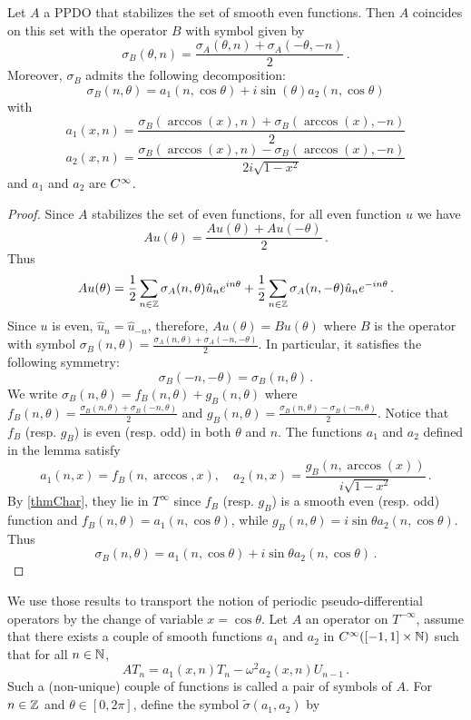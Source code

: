 \documentclass[a4paper]{article}
\begin{document}
\begin{Lem}
	\label{TransportPPDO_T}
	Let $A$ a PPDO that stabilizes the set of smooth even functions. Then $A$ coincides on this set with the operator $B$ with symbol given by 
	\[\sigma_B(\theta,n) = \frac{\sigma_A(\theta,n) + \sigma_A(-\theta,-n)}{2}\,.\]
	Moreover, $\sigma_B$ admits the following decomposition:
	\[ \sigma_B(n,\theta) = a_1(n,\cos\theta) + i \sin(\theta)a_2(n,\cos\theta) \]
	with 
	\[a_1(x,n) = \frac{\sigma_B(\arccos(x),n) + \sigma_B(\arccos(x),-n)}{2}\]
	\[a_2(x,n) = \frac{\sigma_B(\arccos(x),n) - \sigma_B(\arccos(x),-n)}{2i\sqrt{1-x^2}}\] 
	and $a_1$ and $a_2$ are $C^{\infty}$. 
\end{Lem}
\begin{proof}
Since $A$ stabilizes the set of even functions, for all even function $u$ we have 
\[Au(\theta) = \frac{Au(\theta) + Au(-\theta)}{2}\,.\]
Thus
\[Au(\theta) = \frac{1}{2}\sum_{n \in \mathbb{Z}} \sigma_A(n,\theta) \hat{u}_n e^{in\theta} + \frac{1}{2}\sum_{n \in \mathbb{Z}} \sigma_A(n,-\theta)\hat{u}_n e^{-in\theta}\,.\]
Since $u$ is even, $\hat{u}_n = \hat{u}_{-n}$, therefore, $Au(\theta) = Bu(\theta)$ where $B$ is the operator with symbol $\sigma_B(n,\theta) = \frac{\sigma_A(n,\theta) + \sigma_A(-n,-\theta)}{2}$. In particular, it satisfies the following symmetry:
\[\sigma_B(-n,-\theta) = \sigma_B(n,\theta)\,.\] 
We write $\sigma_B(n,\theta) = f_B(n,\theta) + g_B(n,\theta)$ where $f_B(n,\theta) = \frac{\sigma_B(n,\theta) + \sigma_B(-n,\theta)}{2}$ and $g_B(n,\theta) = \frac{\sigma_B(n,\theta) - \sigma_B(-n,\theta)}{2}$. Notice that $f_B$ (resp. $g_B$) is even (resp. odd) in both $\theta$ and $n$.
The functions $a_1$ and $a_2$ defined in the lemma satisfy
\[a_1(n,x) = f_B(n, \arccos,x),\quad a_2(n,x) = \frac{g_B(n,\arccos(x))}{i\sqrt{1-x^2}}\,.\]
By \autoref{thmChar}, they lie in $T^\infty$ since $f_B$ (resp. $g_B$) is a smooth even (resp. odd) function and  $f_B(n,\theta) = a_1(n,\cos\theta)$, while $g_B(n,\theta) = i \sin \theta a_2(n,\cos\theta)$. Thus 
\[\sigma_B(n,\theta) = a_1(n,\cos\theta) + i \sin\theta a_2(n,\cos\theta)\,. \]
\end{proof}
We use those results to transport the notion of periodic pseudo-differential operators by the change of variable $x = \cos\theta$. Let $A$ an operator on $T^{-\infty}$, assume that there exists a couple of smooth functions $a_1$ and $a_2$ in $C^{\infty}([-1,1]\times \mathbb{N})$ such that for all $n \in \mathbb{N}$,
\[AT_n = a_1(x,n) T_n - \omega^2 a_2(x,n) U_{n-1}\,.\]
Such a (non-unique) couple of functions is called a pair of symbols of $A$. For $n\in \mathbb{Z}$ and $\theta \in [0,2\pi]$, define the symbol $\tilde{\sigma}(a_1,a_2)$ by
\end{document}
